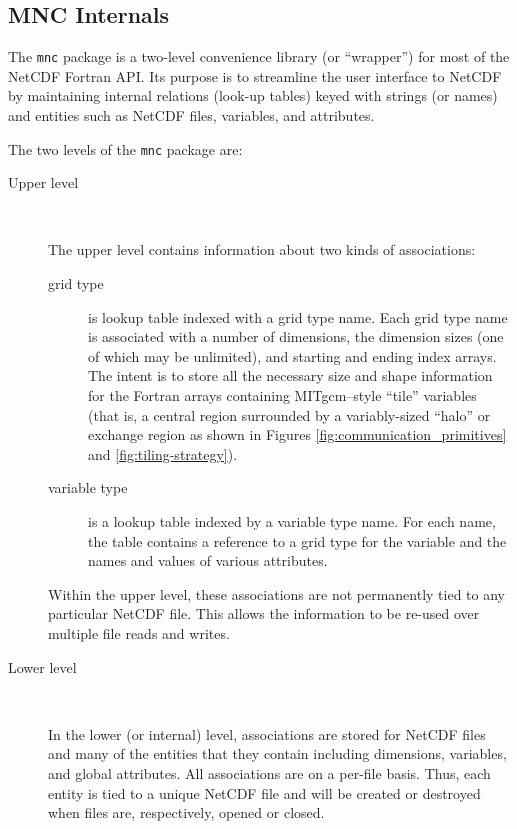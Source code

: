 \subsection{MNC Internals}

The \texttt{mnc} package is a two-level convenience library (or
``wrapper'') for most of the NetCDF Fortran API.  Its purpose is to
streamline the user interface to NetCDF by maintaining internal
relations (look-up tables) keyed with strings (or names) and entities
such as NetCDF files, variables, and attributes.

The two levels of the \texttt{mnc} package are:
\begin{description}

\item[Upper level] \ 
  
  The upper level contains information about two kinds of
  associations:
  \begin{description}
  \item[grid type] is lookup table indexed with a grid type name.
    Each grid type name is associated with a number of dimensions, the
    dimension sizes (one of which may be unlimited), and starting and
    ending index arrays.  The intent is to store all the necessary
    size and shape information for the Fortran arrays containing
    MITgcm--style ``tile'' variables (that is, a central region
    surrounded by a variably-sized ``halo'' or exchange region as
    shown in Figures \ref{fig:communication_primitives} and
    \ref{fig:tiling-strategy}).
  
  \item[variable type] is a lookup table indexed by a variable type
    name.  For each name, the table contains a reference to a grid
    type for the variable and the names and values of various
    attributes.
  \end{description}
  
  Within the upper level, these associations are not permanently tied
  to any particular NetCDF file.  This allows the information to be
  re-used over multiple file reads and writes.

\item[Lower level] \ 
  
  In the lower (or internal) level, associations are stored for NetCDF
  files and many of the entities that they contain including
  dimensions, variables, and global attributes.  All associations are
  on a per-file basis.  Thus, each entity is tied to a unique NetCDF
  file and will be created or destroyed when files are, respectively,
  opened or closed.

\end{description}


